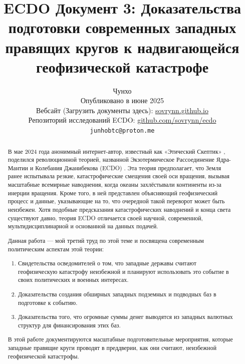 \documentclass[10pt,twocolumn,letterpaper]{article}
\begin{document}
\title{ECDO Документ 3: Доказательства подготовки современных западных правящих кругов к надвигающейся геофизической катастрофе}

\author{Чунхо\\
Опубликовано в июне 2025\\
Вебсайт (Загрузить документы здесь): \href{https://sovrynn.github.io}{sovrynn.github.io}\\
Репозиторий исследований ECDO: \href{https://github.com/sovrynn/ecdo}{github.com/sovrynn/ecdo}\\
{\tt\small junhobtc@proton.me}
}

\maketitle

\begin{abstract}
В мае 2024 года анонимный интернет-автор, известный как «Этический Скептик» \cite{0}, поделился революционной теорией, названной Экзотермическое Рассоединение Ядра-Мантии и Колебания Джанибекова (ECDO) \cite{1}. Эта теория предполагает, что Земля ранее испытывала резкие, катастрофические смещения своей оси вращения, вызывая масштабные всемирные наводнения, когда океаны захлёстывали континенты из-за инерции вращения. Кроме того, в ней представлен объясняющий геофизический процесс и данные, указывающие на то, что очередной такой переворот может быть неизбежен. Хотя подобные предсказания катастрофических наводнений и конца света существуют давно, теория ECDO отличается своей научной, современной, мультидисциплинарной и основанной на данных подачей.

Данная работа — мой третий труд \cite{2,3} по этой теме и посвящена современным политическим аспектам этой теории:
\begin{flushleft}
\begin{enumerate}
    \item Свидетельства осведомителей о том, что западные державы считают геофизическую катастрофу неизбежной и планируют использовать это событие в своих политических и военных интересах.
    \item Доказательства создания обширных западных подземных и подводных баз в подготовке к событию.
    \item Доказательства того, что огромные суммы денег выводятся из западных валютных структур для финансирования этих баз.
\end{enumerate}
\end{flushleft}

В этой работе документируются масштабные подготовительные мероприятия, которые западные правящие круги проводят в преддверии, как они считают, неизбежной геофизической катастрофы.
\end{abstract}
\end{document}
